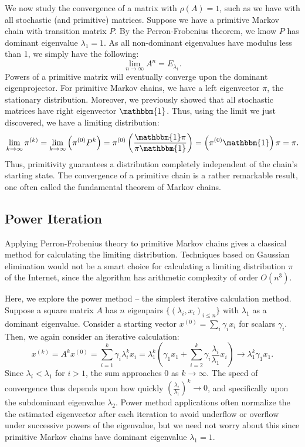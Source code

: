 \documentclass[11pt,letterpaper]{amsart}
\newcommand{\iterate}[2]{#1^{(#2)}}
\newcommand{\parens}[1]{ \left( #1 \right) }
\begin{document}
We now study the convergence of a matrix with $\rho(A) = 1$, such as we have
with all stochastic (and primitive) matrices. Suppose we have a primitive Markov
chain with transition matrix $P$. By the Perron-Frobenius theorem, we know $P$
has dominant eigenvalue $\lambda_1 = 1$. As all non-dominant eigenvalues have
modulus less than 1, we simply have the following:
\begin{equation*}
  \lim_{n\to\infty}{A^n} = E_{\lambda_1}.
\end{equation*}
Powers of a primitive matrix will eventually converge upon the dominant
eigenprojector. For primitive Markov chains, we have a left eigenvector $\pi$,
the stationary distribution. Moreover, we previously showed that all stochastic
matrices have right eigenvector $\mathbbm{1}$. Thus, using the limit we just
discovered, we have a limiting distribution:
\begin{equation}
  \lim_{k\to\infty}{{\iterate{\pi}{k}}} = \lim_{k\to\infty}{\parens{{\iterate{\pi}{0}} P^k}} = \iterate{\pi}{0} \parens{\frac{\mathbbm{1} \pi}{\pi \mathbbm{1}}} = \parens{\iterate{\pi}{0} \mathbbm{1}} \pi = \pi.
\end{equation}
Thus, primitivity guarantees a distribution completely independent of the
chain's starting state. The convergence of a primitive chain is a rather
remarkable result, one often called the fundamental theorem of Markov chains.


\subsection{Power Iteration}
Applying Perron-Frobenius theory to primitive Markov chains gives a classical
method for calculating the limiting distribution. Techniques based on Gaussian
elimination would not be a smart choice for calculating a limiting distribution
$\pi$ of the Internet, since the algorithm has arithmetic complexity of order
$O(n^3)$.

Here, we explore the power method -- the simplest iterative calculation method.
Suppose a square matrix $A$ has $n$ eigenpairs $\{ (\lambda_i,x_i)_{i\leq n} \}$
with $\lambda_1$ as a dominant eigenvalue. Consider a starting vector
$x^{(0)}=\sum_i{\gamma_i x_i}$ for scalars $\gamma_i$. Then, we again consider
an iterative calculation:
\begin{equation}
  \iterate{x}{k} = A^k \iterate{x}{0} = \sum_{i=1}^{k}{\gamma_i \lambda_i^k x_i} = \lambda_1^k\parens{\gamma_1 x_1 + \sum_{i=2}^{k}{\gamma_i \frac{\lambda_i}{\lambda_1} x_i}} \to \lambda_1^k \gamma_1 x_1.
\end{equation}
Since $\lambda_i<\lambda_1$ for $i>1$, the sum approaches 0 as $k\to\infty$. The
speed of convergence thus depends upon how quickly
$\parens{\frac{\lambda_i}{\lambda_1}}^k \to 0$, and specifically upon the
subdominant eigenvalue $\lambda_2$. Power method applications often normalize
the the estimated eigenvector after each iteration to avoid underflow or
overflow under successive powers of the eigenvalue, but we need not worry about
this since primitive Markov chains have dominant eigenvalue $\lambda_1 = 1$.
\end{document}
